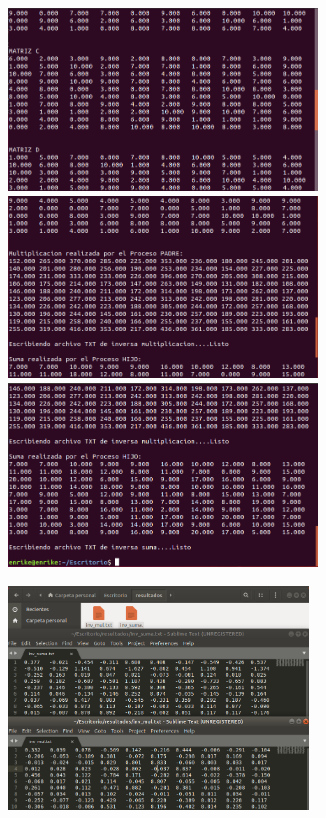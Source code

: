 \documentclass[12pt]{article}
\begin{document}
\begin{itemize}
\begin{figure}[h!]
          \end{figure}
\newpage
          \begin{figure}[h!]
              \centering  
            \includegraphics[width=0.73\textwidth]{Practica6/Images/Linux/4_2.png}  
            \includegraphics[width=0.73\textwidth]{Practica6/Images/Linux/4_3.png}
            \includegraphics[width=0.73\textwidth]{Practica6/Images/Linux/4_4.png}
            
          \end{figure}
      
      \clearpage
          \begin{figure}[h!]
              \centering  
              \includegraphics[width=0.71\textwidth]{Practica6/Images/Linux/4_5.png}
            

\end{figure}
\end{itemize}
\end{document}
